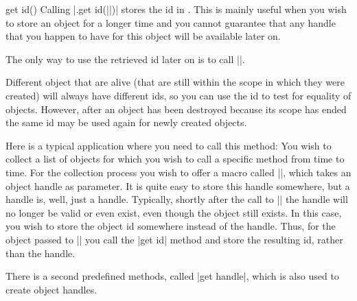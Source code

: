 \begin{predefinedmethod}{get id()}
  Calling |.get id(||)|  stores the id  in
  . This is mainly useful when you wish to store an
  object for a longer time and you cannot guarantee that any handle
  that you happen to have for this object will be available later on.

  The only way to use the retrieved id later on is to call
  |\pgfooobj|.

  Different object that are alive (that are still within the scope in
  which they were created) will always have different ids, so you can
  use the id to test for equality of objects. However, after an object
  has been destroyed because its scope has ended the same id may be
  used again for newly created objects.

  Here is a typical application where you need to call this method:
  You wish to collect a list of objects for which you wish to call a
  specific method from time to time. For the collection process you
  wish to offer a macro called |\addtoobjectlist|, which takes an
  object handle as parameter. It is quite easy to store this handle
  somewhere, but a handle is, well, just a handle. Typically, shortly
  after the call to |\addtoobjectlist| the handle will no longer be
  valid or even exist, even though the object still exists. In this
  case, you wish to store the object id somewhere instead of the
  handle. Thus, for the object passed to |\addtoobjectlist| you call
  the |get id| method and store the resulting id, rather than the handle. 
\end{predefinedmethod}

There is a second predefined methods, called |get handle|, which is also
used to create object handles.





